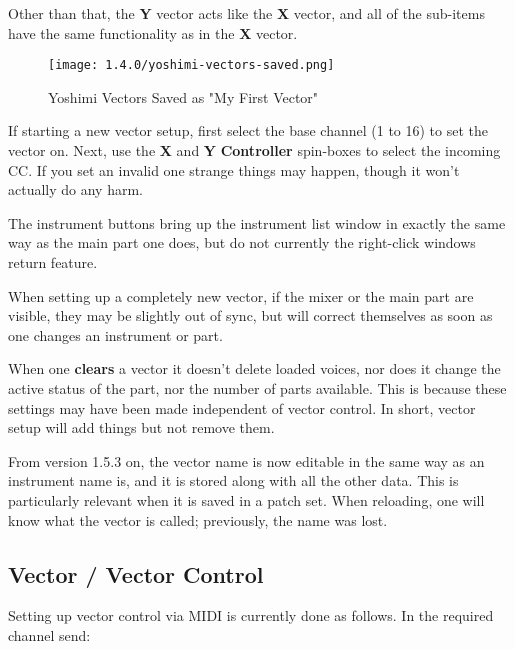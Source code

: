    Other than that, the \textbf{Y} vector acts like the \textbf{X} vector, and
   all of the sub-items have the same functionality as in the
   \textbf{X} vector.

\begin{figure}[H]
   \centering 
   \texttt{[image: 1.4.0/yoshimi-vectors-saved.png]}
   \caption{Yoshimi Vectors Saved as "My First Vector"}
   \label{fig:yoshimi_vectors_saved}
\end{figure}

   If starting a new vector setup, first
   select the base channel (1 to 16) to set the vector on. Next,
   use the \textbf{X} and \textbf{Y} \textbf{Controller}
   spin-boxes to select the incoming CC.
   If you set an invalid one strange things may happen, though it won't
   actually do any harm.

   The instrument buttons bring up the instrument list window in exactly the same
   way as the main part one does, but do not currently the right-click
   windows return feature.

   When setting up a completely new vector, if the mixer or the main part are
   visible, they may be slightly out of sync, but will correct themselves as
   soon as one changes an instrument or part.

   When one \textbf{clears} a vector it doesn't delete loaded voices, nor does
   it change the active status of the part, nor the number of parts available.
   This is because these settings may have been made independent of vector
   control. In short, vector setup will add things but not remove them.

   From version 1.5.3 on, the vector name is now editable in the same way as an
   instrument name is, and it is stored along with all the other data. This is
   particularly relevant when it is saved in a patch set. When reloading, one
   will know what the vector is called; previously, the name was lost.

\subsection{Vector / Vector Control}
\label{subsection:vector_control}

   Setting up vector control via MIDI is currently done as follows.
   In the required channel send:

